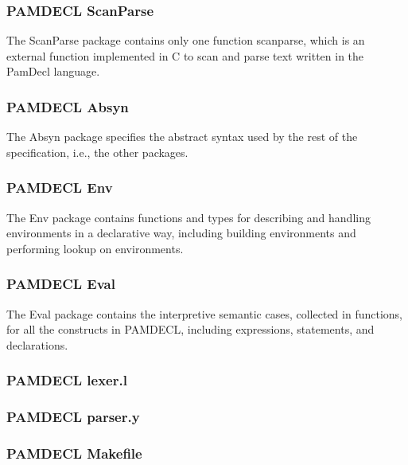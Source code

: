 \documentclass[10.5pt,a4]{article}
\begin{document}
\subsubsection{PAMDECL ScanParse}
The ScanParse package contains only one function scanparse, which is an external function implemented in C to scan and parse text written in the PamDecl language.


\subsubsection{PAMDECL Absyn}
The Absyn package specifies the abstract syntax used by the rest of the specification, i.e., the other packages.


\subsubsection{PAMDECL Env}
The Env package contains functions and types for describing and handling environments in a declarative way, including building environments and performing lookup on environments.


\subsubsection{PAMDECL Eval}
The Eval package contains the interpretive semantic cases, collected in functions, for all the constructs in PAMDECL, including expressions, statements, and declarations.


\lstset{language=}
\subsubsection{PAMDECL lexer.l}


\subsubsection{PAMDECL parser.y}

\lstset{language=modelica}

\subsubsection{PAMDECL Makefile}

\end{document}

